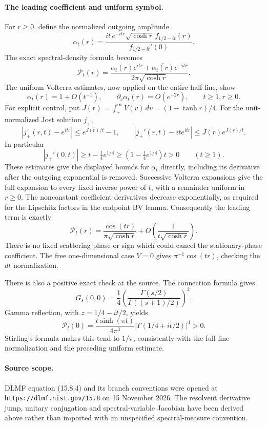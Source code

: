 \paragraph{The leading coefficient and uniform symbol.}
For $r\geq0$, define the normalized outgoing amplitude
\[
 \alpha_t(r)=
 \frac{it\,e^{-itr}\sqrt{\cosh r}\,f_{1/2-it}(r)}
      {f_{1/2-it}'(0)}.
\]
The exact spectral-density formula becomes
\[
 \mathcal P_t(r)=\frac{
    \alpha_t(r)e^{itr}+\overline{\alpha_t(r)}e^{-itr}}
                  {2\pi\sqrt{\cosh r}}.
\]
The uniform Volterra estimates, now applied on the entire half-line,
show
\[
 \alpha_t(r)=1+O(t^{-1}),\qquad
 \partial_r\alpha_t(r)=O(e^{-2r}),
 \qquad t\geq1, r\geq0.
\]
For explicit control, put
$J(r)=\int_r^\infty V(v)\,dv=(1-\tanh r)/4$.
For the unit-normalized Jost solution $j_+$,
\[
 |j_+(r,t)-e^{itr}|\leq e^{J(r)/t}-1,
 \qquad
 |j_+'(r,t)-it e^{itr}|\leq J(r)e^{J(r)/t}.
\]
In particular
\[
 |j_+'(0,t)|\geq t-\tfrac14e^{1/4}
 \geq\left(1-\tfrac14e^{1/4}\right)t>0
 \qquad(t\geq1).
\]
These estimates give the displayed bounds for $\alpha_t$ directly,
including its derivative after the outgoing exponential is removed.
Successive Volterra expansions give the full expansion to every
fixed inverse power of $t$, with a remainder uniform in $r\geq0$.
The nonconstant coefficient derivatives decrease exponentially,
as required for the Lipschitz factors in the endpoint BV lemma.
Consequently the leading term is exactly
\[
 \boxed{\quad
 \mathcal P_t(r)=\frac{\cos(tr)}{\pi\sqrt{\cosh r}}
       +O\!\left(\frac{1}{t\sqrt{\cosh r}}\right).
 \quad}
\]
There is no fixed scattering phase or sign which could cancel the
stationary-phase coefficient.  The free one-dimensional case
$V=0$ gives $\pi^{-1}\cos(tr)$, checking the $dt$ normalization.

There is also a positive exact check at the source.  The connection
formula gives
\[
 G_s(0,0)=\frac14
 \left(\frac{\Gamma(s/2)}{\Gamma((s+1)/2)}\right)^2.
\]
Gamma reflection, with $z=1/4-it/2$, yields
\[
 \mathcal P_t(0)=
 \frac{t\sinh(\pi t)}{4\pi^3}
       |\Gamma(1/4+it/2)|^4>0.
\]
Stirling's formula makes this tend to $1/\pi$, consistently with
the full-line normalization and the preceding uniform estimate.

\paragraph{Source scope.}
DLMF equation (15.8.4) and its branch conventions were opened at
\texttt{https://dlmf.nist.gov/15.8} on 15 November 2026.
The resolvent derivative jump, unitary conjugation and
spectral-variable Jacobian have been derived above rather than
imported with an unspecified spectral-measure convention.
